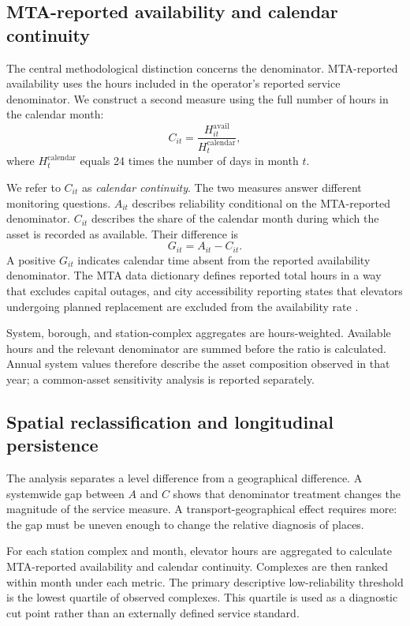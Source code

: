 \subsection{MTA-reported availability and calendar continuity}

The central methodological distinction concerns the denominator. MTA-reported availability uses the hours included in the operator's reported service denominator. We construct a second measure using the full number of hours in the calendar month:
\begin{equation}
C_{it} = \frac{H^{\mathrm{avail}}_{it}}{H^{\mathrm{calendar}}_{t}},
\end{equation}
where $H^{\mathrm{calendar}}_{t}$ equals 24 times the number of days in month $t$.

We refer to $C_{it}$ as \emph{calendar continuity}. The two measures answer different monitoring questions. $A_{it}$ describes reliability conditional on the MTA-reported denominator. $C_{it}$ describes the share of the calendar month during which the asset is recorded as available. Their difference is
\begin{equation}
G_{it} = A_{it} - C_{it}.
\end{equation}
A positive $G_{it}$ indicates calendar time absent from the reported availability denominator. The MTA data dictionary defines reported total hours in a way that excludes capital outages, and city accessibility reporting states that elevators undergoing planned replacement are excluded from the availability rate \citep{mopd2025}.

System, borough, and station-complex aggregates are hours-weighted. Available hours and the relevant denominator are summed before the ratio is calculated. Annual system values therefore describe the asset composition observed in that year; a common-asset sensitivity analysis is reported separately.

\subsection{Spatial reclassification and longitudinal persistence}

The analysis separates a level difference from a geographical difference. A systemwide gap between $A$ and $C$ shows that denominator treatment changes the magnitude of the service measure. A transport-geographical effect requires more: the gap must be uneven enough to change the relative diagnosis of places.

For each station complex and month, elevator hours are aggregated to calculate MTA-reported availability and calendar continuity. Complexes are then ranked within month under each metric. The primary descriptive low-reliability threshold is the lowest quartile of observed complexes. This quartile is used as a diagnostic cut point rather than an externally defined service standard.

